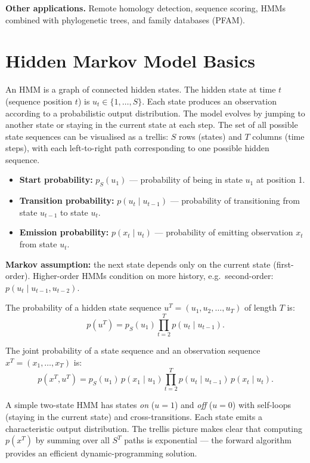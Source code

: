 \documentclass[11pt, oneside]{book}
\begin{document}
\textbf{Other applications.}
Remote homology detection, sequence scoring, HMMs combined with phylogenetic trees,
and family databases (PFAM).

\section{Hidden Markov Model Basics}

An HMM is a graph of connected hidden states.
The hidden state at time $t$ (sequence position $t$) is $u_t \in \{1,\ldots,S\}$.
Each state produces an observation according to a probabilistic output distribution.
The model evolves by jumping to another state or staying in the current state at each step.
The set of all possible state sequences can be visualised as a trellis: $S$ rows (states)
and $T$ columns (time steps), with each left-to-right path corresponding to one possible
hidden sequence.

\begin{defbox}[title={HMM Parameters}]
\begin{itemize}
  \item \textbf{Start probability:} $p_S(u_1)$ — probability of being in state $u_1$ at position 1.
  \item \textbf{Transition probability:} $p(u_t \mid u_{t-1})$ — probability of transitioning
        from state $u_{t-1}$ to state $u_t$.
  \item \textbf{Emission probability:} $p(x_t \mid u_t)$ — probability of emitting observation $x_t$
        from state $u_t$.
\end{itemize}
\textbf{Markov assumption:} the next state depends only on the current state (first-order).
Higher-order HMMs condition on more history, e.g.\ second-order: $p(u_t \mid u_{t-1}, u_{t-2})$.
\end{defbox}

The probability of a hidden state sequence $u^T = (u_1, u_2, \ldots, u_T)$ of length $T$ is:
\begin{equation}
  p(u^T) = p_S(u_1) \prod_{t=2}^{T} p(u_t \mid u_{t-1}).
\end{equation}

The joint probability of a state sequence and an observation sequence $x^T = (x_1,\ldots,x_T)$ is:
\begin{equation}
  p(x^T, u^T) = p_S(u_1)\, p(x_1 \mid u_1) \prod_{t=2}^{T} p(u_t \mid u_{t-1})\, p(x_t \mid u_t).
\end{equation}

\begin{intbox}
A simple two-state HMM has states \emph{on} ($u=1$) and \emph{off} ($u=0$) with
self-loops (staying in the current state) and cross-transitions. Each state emits
a characteristic output distribution. The trellis picture makes clear that computing
$p(x^T)$ by summing over all $S^T$ paths is exponential — the forward algorithm
provides an efficient dynamic-programming solution.
\end{intbox}
\end{document}
